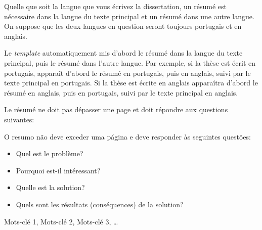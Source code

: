 

Quelle que soit la langue que vous écrivez la dissertation, un résumé est nécessaire dans la langue du texte principal et un résumé dans une autre langue. On suppose que les deux langues en question seront toujours portugais et en anglais.

Le \emph{template} automatiquement mis d'abord le résumé dans la langue du texte principal, puis le résumé dans l'autre langue. Par exemple, si la thèse est écrit en portugais, apparaît d'abord le résumé en portugais, puis en anglais, suivi par le texte principal en portugais. Si la thèse est écrite en anglais apparaîtra d'abord le résumé en anglais, puis en portugais, suivi par le texte principal en anglais.

Le résumé ne doit pas dépasser une page et doit répondre aux questions suivantes:

O resumo não deve exceder uma página e deve responder às seguintes questões:
\begin{itemize}
	\item Quel est le problème?
	\item Pourquoi est-il intéressant?
	\item Quelle est la solution?
	\item Quels sont les résultats (conséquences) de la solution?
\end{itemize}

\begin{keywords}
Mots-clé 1, Mots-clé 2, Mots-clé 3, \ldots
\end{keywords}
